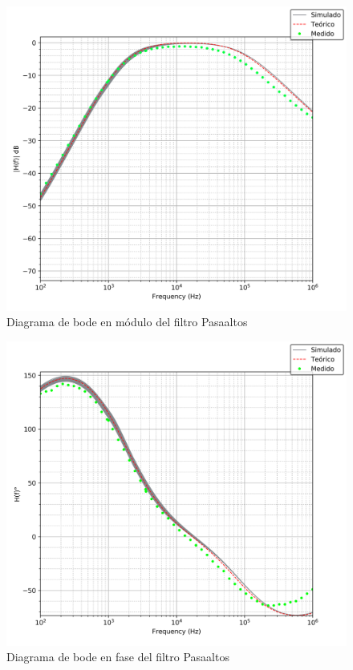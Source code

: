 \begin{figure}[H]
    \centering
        \includegraphics[scale=0.1]{../EJ2/Recursos/bode_pasaaltos_modulo.png}
    \caption{Diagrama de bode en m\'odulo del filtro Pasaaltos}
    \label{fig:bode_pasaaltos_modulo}
\end{figure}

\begin{figure}[H]
    \centering
        \includegraphics[scale=0.5]{../EJ2/Recursos/bode_pasaaltos_fase.png}
    \caption{Diagrama de bode en fase del filtro Pasaaltos}
    \label{fig:bode_pasaaltos_fase}
\end{figure}

